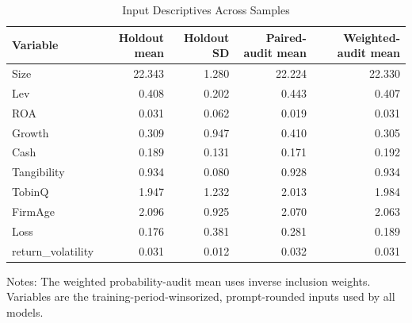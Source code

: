 \begin{table}[!htbp]\centering
\caption{Input Descriptives Across Samples}\label{tab:a_descriptives}
\begin{threeparttable}\begin{tabular}{lrrrr}\toprule
Variable & Holdout mean & Holdout SD & Paired-audit mean & Weighted-audit mean \\
\midrule
Size & 22.343 & 1.280 & 22.224 & 22.330 \\
Lev & 0.408 & 0.202 & 0.443 & 0.407 \\
ROA & 0.031 & 0.062 & 0.019 & 0.031 \\
Growth & 0.309 & 0.947 & 0.410 & 0.305 \\
Cash & 0.189 & 0.131 & 0.171 & 0.192 \\
Tangibility & 0.934 & 0.080 & 0.928 & 0.934 \\
TobinQ & 1.947 & 1.232 & 2.013 & 1.984 \\
FirmAge & 2.096 & 0.925 & 2.070 & 2.063 \\
Loss & 0.176 & 0.381 & 0.281 & 0.189 \\
return\_volatility & 0.031 & 0.012 & 0.032 & 0.031 \\
\bottomrule\end{tabular}
\begin{tablenotes}[flushleft]\footnotesize\item Notes: The weighted probability-audit mean uses inverse inclusion weights. Variables are the training-period-winsorized, prompt-rounded inputs used by all models.\end{tablenotes}
\end{threeparttable}\end{table}
